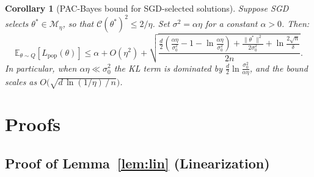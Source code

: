 \documentclass[11pt,a4paper]{article}
\newtheorem{corollary}[theorem]{Corollary}
\theoremstyle{definition}
\theoremstyle{remark}
\newcommand{\E}{\mathbb{E}}
\newcommand{\cM}{\mathcal{M}}
\newcommand{\cC}{\mathcal{C}}
\begin{document}
\begin{corollary}[PAC-Bayes bound for SGD-selected solutions]\label{cor:pb}
  Suppose SGD selects $\theta^* \in \cM_\eta$, so that
  $\cC(\theta^*)^2 \leq 2/\eta$.  Set $\sigma^2 = \alpha\eta$ for a constant
  $\alpha > 0$.  Then:
  \[
    \E_{\theta \sim Q}[L_{\mathrm{pop}}(\theta)]
    \leq \alpha + O(\eta^2)
    + \sqrt{
      \frac{
        \frac{d}{2}\!\left(\frac{\alpha\eta}{\sigma_0^2} - 1
        - \ln\frac{\alpha\eta}{\sigma_0^2}\right)
        + \frac{\|\theta^*\|^2}{2\sigma_0^2}
        + \ln\frac{2\sqrt{n}}{\delta}
      }{2n}
    }.
  \]
  In particular, when $\alpha\eta \ll \sigma_0^2$ the KL term is dominated by
  $\frac{d}{2}\ln\frac{\sigma_0^2}{\alpha\eta}$, and the bound scales as
  $O\bigl(\sqrt{d\,\ln(1/\eta)\,/\,n}\bigr)$.
\end{corollary}

\section{Proofs}\label{sec:proofs}

\subsection{Proof of Lemma~\ref{lem:lin} (Linearization)}
\end{document}
